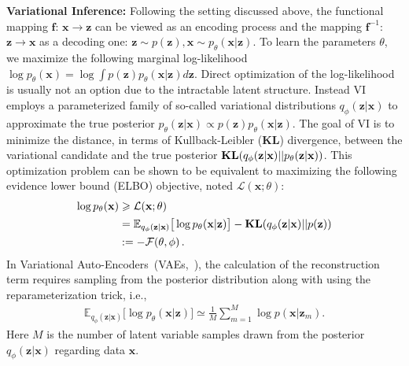 \documentclass[twoside]{article}
\begin{document}
\textbf{Variational Inference:}
Following the setting discussed above, the functional mapping $\mathbf{f}$: $\mathbf{x} \xrightarrow{} \mathbf{z}$ can be viewed as an encoding process and the mapping $\mathbf{f}^{-1}$: $\mathbf{z} \xrightarrow{} \mathbf{x}$ as a decoding one: $\mathbf{z} \sim p(\mathbf{z}), \mathbf{x} \sim p_{\theta}(\mathbf{x}|\mathbf{z}).$
To learn the parameters $\theta$, we maximize the following marginal log-likelihood $ \log p_{\theta}(\mathbf{x}) = \log \int p(\mathbf{z})  p_{\theta}(\mathbf{x}|\mathbf{z})d\mathbf{z}$.
Direct optimization of the log-likelihood is usually not an option due to the intractable latent structure. Instead VI employs a parameterized family of so-called variational distributions $q_{\phi}(\mathbf{z}|\mathbf{x})$ to approximate the true posterior $p_{\theta}(\mathbf{z}|\mathbf{x}) \varpropto  p(\mathbf{z})  p_{\theta}(\mathbf{x}|\mathbf{z})$.
The goal of VI is to minimize the distance, in terms of Kullback-Leibler ($\mathbf{KL}$) divergence, between the variational candidate and the true posterior $\textbf{\text{KL}}(q_{\phi}(\mathbf{z}|\mathbf{x})||p_{\theta}(\mathbf{z}|\mathbf{x}) )$.
This optimization problem can be shown to be equivalent to maximizing the following evidence lower bound (ELBO) objective, noted $\mathcal{L}(\mathbf{x}; \theta)$: 
\begin{align}\label{eq:vi_elbo}
    \log p_{\theta}(\mathbf{x})
    &\geqslant \mathcal{L}(\mathbf{x}; \theta) \\ \notag
    &=\mathbb{E}_{q_{\phi}(\mathbf{z}|\mathbf{x})} \big[\log p_{\theta}(\mathbf{x}|\mathbf{z}) \big] - \textbf{\text{KL}}(q_{\phi}(\mathbf{z}|\mathbf{x})||p(\mathbf{z}))\\ \notag
    &:=-\mathcal{F}(\theta, \phi) \, .
\end{align}
In Variational Auto-Encoders~(VAEs,~\cite{kingma2013auto}), the calculation of the reconstruction term requires sampling from the posterior distribution along with using the reparameterization trick, i.e.,
\begin{align} \label{eq:vae_recon}
\mathbb{E}_{q_{\phi}(\mathbf{z}|\mathbf{x})} \big[\log p_{\theta}(\mathbf{x}|\mathbf{z}) \big] \simeq \frac{1}{M}\sum_{m=1}^M \log p(\mathbf{x}| \mathbf{z}_{m}). \end{align} %
Here $M$ is the number of latent variable samples drawn from the posterior $q_{\phi}(\mathbf{z}|\mathbf{x})$ regarding data $\mathbf{x}$. 
\end{document}
